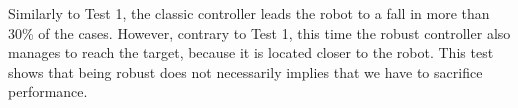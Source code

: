 Similarly to Test 1, the classic controller leads the robot to a fall in more than 30\% of the cases.
However, contrary to Test 1, this time the robust controller also manages to reach the target, because it is located closer to the robot.
This test shows that being robust does not necessarily implies that we have to sacrifice performance.

